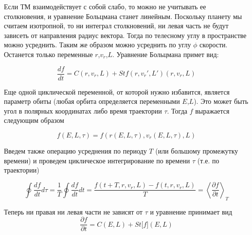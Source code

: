Если ТМ взаимодействует с собой слабо, то можно не учитывать ее столкновения, и уравнение Больцмана станет линейным. Поскольку планету мы считаем изотропной, то ни интеграл столкновений, ни левая часть не будут зависеть от направления радиус вектора. Тогда по телесному углу в пространстве можно усреднить. Таким же образом можно усреднить по углу $\phi$ скорости. Останется только переменные $r$,$v_r$,$L$.
Уравнение Больцмана примет вид:

\begin{equation}
\label{eq:boltsman}
\frac{df}{dt} = C\left( {r,v_{r},L} \right) + St f( r,v_{r}',L') \left( r,v_{r},L \right)
\end{equation}

Еще одной циклической переменной, от которой нужно избавится, является параметр обиты (любая орбита определяется переменными $E$,$L$). Это может быть угол в полярных координатах либо время траектории $\tau$. Тогда $f$ выражается следующим образом

\begin{equation}
\label{eq:coord_new}
f(E,L,\tau)  = f(r(E,L,\tau),v_{r}(E,L,\tau),L)
\end{equation}

Введем также операцию усреднения по периоду $T$ (или большому промежутку времени) и проведем циклическое интегрирование по времени $\tau$ (т.е. по траектории)

\begin{equation}
\label{eq:cyclic_integral}
{\oint{\frac{df}{dt}d\tau}} = \frac{1}{T}{\oint{\frac{df}{dt}dt}} = \frac{f\left( {t + T,r,v_{r},L} \right) - f\left( t,r,v_{r},L \right)}{T} = \left\langle \frac{\partial f}{\partial t} \right\rangle_{T}
\end{equation}

Теперь ни правая ни левая части не зависят от $\tau$ и уравнение принимает вид
\begin{equation}
\label{eq:boltsman_EL}
\frac{\partial f}{\partial t} = C\left( {E,L} \right) + St\lbrack f\rbrack(E,L)
\end{equation}
	 
